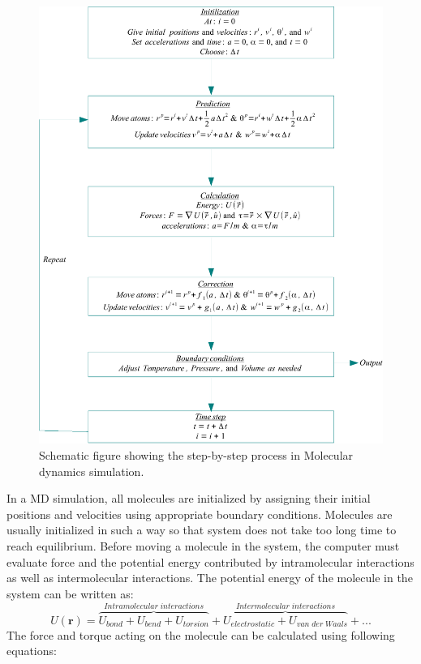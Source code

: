 \begin{figure}[tpb]
  \begin{center}
    \centerline{\includegraphics[width = \linewidth]{MD_flowchart.pdf}}
    \caption{Schematic figure showing the step-by-step process in Molecular dynamics simulation.}%
    \label{fig:MD}
  \end{center}
\end{figure}

In a MD simulation, all molecules are initialized by assigning their initial positions and velocities using appropriate boundary conditions. Molecules are usually initialized in such a way so that system does not take too long time to reach equilibrium. Before moving a molecule in the system, the computer must evaluate force and the potential energy contributed by intramolecular interactions as well as intermolecular interactions. The potential energy of the molecule in the system can be written as:
\begin{equation}
U(\mathbf r) = \overbrace{U_{bond} + U_{bend} + U_{torsion}}^{Intramolecular\; interactions} + \overbrace{U_{electrostatic} + U_{van\;der \;Waals}}^{Intermolecular\;interactions} + ...
\label{eq:potential}
\end{equation}   
The force and torque acting on the molecule can be calculated using following equations:

